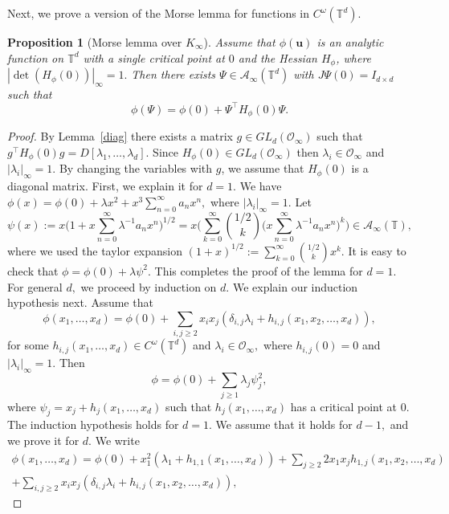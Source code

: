\documentclass[11pt]{amsart}
\theoremstyle{plain}
\theoremstyle{plain}
\newtheorem{proposition}[theorem]{Proposition}
\renewcommand{\vec}[1]{\mathbf{#1}}
\theoremstyle{remark}
\theoremstyle{definition}
\newcommand{\Ki}{K_\infty}
\newcommand{\TT}{\mathbb{T}}
\newcommand{\cA}{\mathcal{A}}
\newcommand{\cO}{\mathcal{O}}
\begin{document}
Next, we prove a version of the Morse lemma for functions in $C^{\omega}(\TT^d).$
\begin{proposition}[Morse lemma over $\Ki$]\label{prop:morse} Assume that $\phi(\vec{u})$ is an analytic function on $\TT^d$ with a single critical point at $0$ and the Hessian $H_{\phi}$, where $|\det(H_{\phi}(0))|_{\infty}=1.$  Then there exists $\Psi\in \cA_{\infty}(\TT^d)$ with $J\Psi(0)=I_{d\times d}$ such that  
\[
\phi(\Psi)=\phi(0)+\Psi^{\intercal}H_{\phi}(0)\Psi.
\]
\end{proposition}
\begin{proof}
By Lemma~\ref{diag} there exists a matrix $g\in GL_d(\cO_{\infty})$ such that $g^{\intercal} H_{\phi}(0)g=D[\lambda_1,\dots,\lambda_d].$ Since $H_{\phi}(0) \in GL_d(\cO_{\infty}) $  then  $\lambda_i \in \cO_{\infty}$ and $|\lambda_i|_{\infty}=1.$ By changing the variables with $g$, we assume that $H_{\phi}(0)$ is a diagonal matrix. First, we explain it 
for $d=1.$ We have $\phi(x)= \phi(0)+ \lambda x^2+ x^3\sum_{n=0}^{\infty} a_nx^n,$ where $|\lambda_i|_{\infty}=1.$ Let 
\[
\psi(x):=x\big(1+x\sum_{n=0}^{\infty} \lambda^{-1}a_nx^n\big)^{1/2}=x\Big( \sum_{k=0}^{\infty}\binom{1/2}{k}\big(x\sum_{n=0}^{\infty}  \lambda^{-1} a_nx^n\big)^k \Big)\in  \cA_{\infty}(\TT),
\]
where we used the taylor expansion $(1+x)^{1/2}:=\sum_{k=0}^{\infty}\binom{1/2}{k}x^k.$ It is easy to check that $\phi= \phi(0)+\lambda \psi^2.$ This completes the proof of the lemma for $d=1.$ For general $d,$ we proceed by induction on $d.$ We explain our induction hypothesis next. Assume that 
\[
 \phi(x_1,\dots,x_d)= \phi(0)+\sum_{i,j\geq 2 }x_ix_j(\delta_{i,j}\lambda_i+h_{i,j}(x_1,x_2,\dots,x_d)),
\]
for some $h_{i,j}(x_1,\dots,x_d)\in C^{\omega}(\TT^d)$ and $\lambda_i\in \cO_{\infty},$ where $h_{i,j}(0)=0$ and $|\lambda_i|_{\infty}=1.$ Then 
\[
\phi=\phi(0)+\sum_{j\geq 1}\lambda_j \psi_j^2,
\]
where $\psi_{j}=x_j+h_j(x_1,\dots,x_d)$ such that $h_j(x_1,\dots,x_d)$ has a critical point at 0. The induction hypothesis holds for $d=1.$ We assume that  it holds for $d-1,$ and we prove it for $d.$ We write 
\begin{multline*}
 \phi(x_1,\dots,x_d)= \phi(0)+ x_1^2(\lambda_1+h_{1,1}(x_1,\dots,x_d))+ \sum_{j\geq 2}2x_1x_j h_{1,j}(x_1,x_2,\dots,x_d) 
\\
  +\sum_{i,j\geq 2 }x_ix_j(\delta_{i,j}\lambda_i+h_{i,j}(x_1,x_2,\dots,x_d)),
\end{multline*}


\end{proof}
\end{document}
